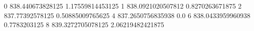 0 838.440673828125 1.17559814453125
1 838.0921020507812 0.8270263671875
2 837.77392578125 0.50885009765625
4 837.2650756835938 0.0
6 838.0433959960938 0.7783203125
8 839.3272705078125 2.06219482421875
